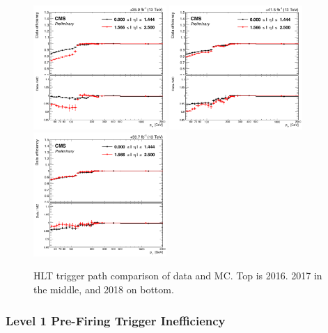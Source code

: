 \begin{figure}[htbp]
  \centering
  \includegraphics[width=0.45\textwidth]{figures/2016/2016_electron_HLT_SF.png}
  \vspace{0.01\textwidth}
  \includegraphics[width=0.45\textwidth]{figures/2017/2017_electron_HLT_SF.png}
  \vspace{0.01\textwidth}
  \includegraphics[width=0.45\textwidth]{figures/2018/2018_electron_HLT_SF.png}
  \caption{HLT trigger path comparison of data and MC.  Top is 2016. 2017 in the middle, and 2018 on bottom.}
 
  \label{fig:electronHLTSF}
\end{figure}

\subsubsection{Level 1 Pre-Firing Trigger Inefficiency}


